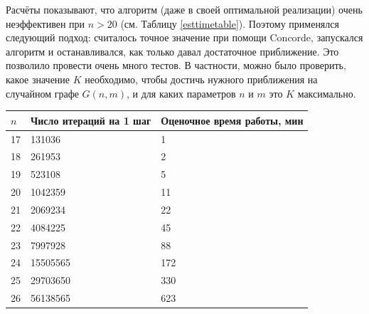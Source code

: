 \begin{figure}
\centering
{}
\qquad
{}
\qquad
{}
\caption{}
\end{figure}

Расчёты показывают, что алгоритм (даже в своей оптимальной реализации) очень неэффективен при $n>20$ (см. Таблицу \ref{esttimetable}). Поэтому применялся следующий подход: считалось точное значение при помощи Concorde, запускался алгоритм и  останавливался, как только давал достаточное приближение. Это позволило провести очень много тестов. В частности, можно было проверить, какое значение $K$ необходимо, чтобы достичь нужного приближения на случайном графе $G(n, m)$, и для каких параметров $n$ и $m$ это $K$ максимально.

\begin{center}
\begin{tabular}{|l|l|l|}
\hline
$n$ & Число итераций на 1 шаг & Оценочное время работы, мин \\ \hline
17 & 131036 & 1\\ \hline
18 & 261953 & 2\\ \hline
19 & 523108 & 5\\ \hline
20 & 1042359 & 11\\ \hline
21 & 2069234 & 22\\ \hline
22 & 4084225 & 45\\ \hline
23 & 7997928 & 88\\ \hline
24 & 15505565 & 172\\ \hline
25 & 29703650 & 330\\ \hline
26 & 56138565 & 623\\ \hline
\end{tabular}
 \label{esttimetable}
\end{center}


